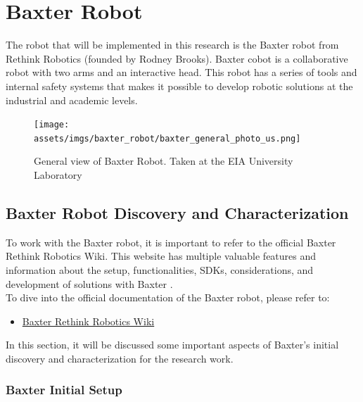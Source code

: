 \documentclass[11pt]{report} %
\begin{document}

\chapter{Baxter Robot}

The robot that will be implemented in this research is the Baxter robot from Rethink Robotics (founded by Rodney Brooks)\citep{cite_baxter_main_wiki}. Baxter cobot is a collaborative robot with two arms and an interactive head. This robot has a series of tools and internal safety systems that makes it possible to develop robotic solutions at the industrial and academic levels.\\

\begin{figure}[H]
    \centering
    \texttt{[image: assets/imgs/baxter\_robot/baxter\_general\_photo\_us.png]}
    \caption{General view of Baxter Robot. Taken at the EIA University Laboratory} 
    \label{fig_baxter_general_photo_us}
\end{figure}

\section{Baxter Robot Discovery and Characterization}

To work with the Baxter robot, it is important to refer to the official Baxter Rethink Robotics Wiki. This website has multiple valuable features and information about the setup, functionalities, SDKs, considerations, and development of solutions with Baxter \citep{cite_baxter_main_wiki}.\\

To dive into the official documentation of the Baxter robot, please refer to:

\begin{itemize}
    \color{blue}
    \item \href{https://sdk.rethinkrobotics.com/wiki/Home}{Baxter Rethink Robotics Wiki}
\end{itemize}

In this section, it will be discussed some important aspects of Baxter's initial discovery and characterization for the research work.\\

\subsection{Baxter Initial Setup}
\end{document}
